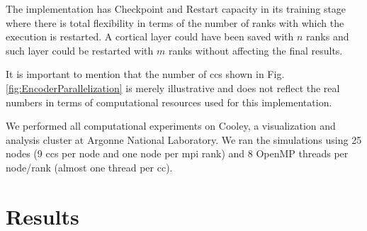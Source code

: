 \documentclass[10pt,letterpaper]{article}
\begin{document}
\pagebreak

The implementation has Checkpoint and Restart capacity in its training stage where there is total flexibility
in terms of the number of ranks with which the execution is restarted. A cortical layer could have been saved
with $n$ ranks and such layer could be restarted with $m$ ranks without affecting the final results.


It is important to mention that the number of \glspl{cc} shown in
Fig. \ref{fig:EncoderParallelization} is merely illustrative and
does not reflect the real numbers in terms of computational resources used for this implementation.


We performed all computational experiments on Cooley, a visualization and analysis cluster at Argonne National Laboratory. We ran the simulations using 25 nodes (9 \glspl{cc} per node and one node per \gls{mpi} rank) and 8 OpenMP threads per node/rank (almost one thread per \gls{cc}).




\section*{Results}
\end{document}
